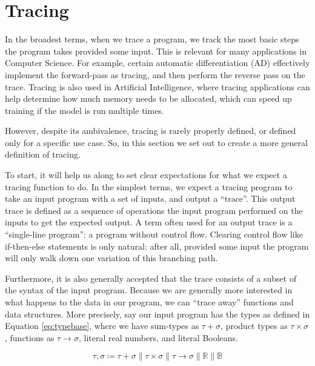 \section{Tracing} \label{sec:tracing}
    In the broadest terms, when we trace a program, we track the most basic steps the program takes provided some input.
    This is relevant for many applications in Computer Science.
    For example, certain automatic differentiation (AD) effectively implement the forward-pass as tracing, and then perform the reverse pass on the trace\cn.
    Tracing is also used in Artificial Intelligence, where tracing applications can help determine how much memory needs to be allocated, which can speed up training if the model is run multiple times\cn.

    However, despite its ambivalence, tracing is rarely properly defined, or defined only for a specific use case.
    So, in this section we set out to create a more general definition of tracing.
    
    To start, it will help us along to set clear expectations for what we expect a tracing function to do.
    In the simplest terms, we expect a tracing program to take an input program with a set of inputs, and output a ``trace''.
    This output trace is defined as a sequence of operations the input program performed on the inputs to get the expected output.
    A term often used for an output trace is a ``single-line program''\cn: a program without control flow.
    Clearing control flow like if-then-else statements is only natural: after all, provided some input the program will only walk down one variation of this branching path.

    Furthermore, it is also generally accepted that the trace consists of a subset of the syntax of the input program.
    Because we are generally more interested in what happens to the data in our program, we can ``trace away'' functions and data structures.
    More precisely, say our input program has the types as defined in Equation \ref{eq:typebase}, where we have sum-types as $\tau+\sigma$, product types as $\tau\times\sigma$, functions as $\tau\to\sigma$, literal real numbers, and literal Booleans.

    \begin{equation}
        \label{eq:typebase}
        \tau,\sigma\coloneqq\tau+\sigma\|\tau\times\sigma\|\tau\to\sigma\|\mathbb{R}\|\mathbb{B}
    \end{equation}

